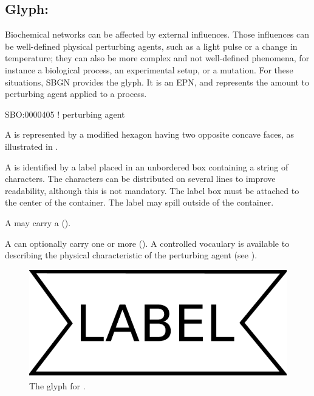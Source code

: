 
\subsection{Glyph: }
\label{sec:perturbing agent}
 
Biochemical networks can be affected by external influences.  Those
influences can be well-defined physical perturbing agents, such as a light
pulse or a change in temperature; they can also be more complex and not
well-defined phenomena, for instance a biological process, an experimental
setup, or a mutation.  For these situations, SBGN provides the
 glyph. It is an EPN, and represents the amount to perturbing agent applied to a process.  

\begin{glyphDescription}

\glyphSboTerm SBO:0000405 ! perturbing agent

\glyphContainer A  is represented by a modified hexagon
having two opposite concave faces, as illustrated in .

\glyphLabel A  is identified by a label placed in an
unbordered box containing a string of characters.  The characters can be
distributed on several lines to improve readability, although this is not
mandatory.  The label box must be attached to the center of the
 container.  The label may spill outside of the container.

\glyphAux A  may carry a 
().

A  can optionally carry one or more  ().  A controlled vocaulary is available to describing the physical characteristic of the perturbing agent (see ).  

\end{glyphDescription}

\begin{figure}[H]
  \centering
  \includegraphics[scale = 0.3]{images/perturbing_agent}
  \caption{The \PD glyph for .}
  \label{fig:perturbing agent}
\end{figure}





